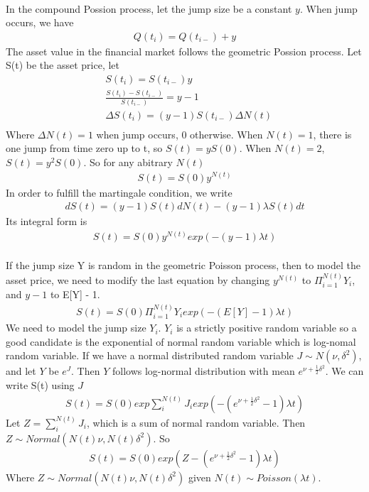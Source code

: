\documentclass[a4paper]{article}
\begin{document}
\\
In the compound Possion process, let the jump size be a constant $y$. When jump occurs, we have 
\begin{align*}
	Q(t_i) = Q(t_{i-}) + y 
\end{align*}
The asset value in the financial market follows the geometric Possion process. Let S(t) be the asset price, let
\begin{align*}
	& S(t_i) = S(t_{i-}) y \\
	& \frac{S(t_i) - S(t_{i-})}{S(t_{i-})} =  y - 1 \\
	&  \Delta S(t_i) =  (y - 1) S(t_{i-}) \Delta N(t)  \\
\end{align*}
Where $\Delta N(t) = 1$ when jump occurs, $0$ otherwise. When $N(t) = 1$, there is one jump from time zero up to t, so $S(t) = yS(0)$. When $N(t) = 2$, $S(t) = y^2 S(0)$. So for any abitrary $N(t)$
\begin{align*}
	S(t) = S(0)y^{N(t)} 
\end{align*}
In order to fulfill the martingale condition, we write
\begin{align*}
	dS(t) = (y - 1)S(t) dN(t) - (y - 1) \lambda S(t) dt
\end{align*}
Its integral form is
\begin{align*}
	S(t) = S(0)y^{N(t)} exp(- (y - 1) \lambda t) 
\end{align*}
\\
If the jump size Y is random in the geometric Poisson process, then to model the asset price, we need to modify
the last equation by changing $y^{N(t)}$ to $\Pi_{i=1}^{N(t)} Y_i$, and $y - 1$ to E[Y] - 1. 
\begin{align*}
	S(t) = S(0)\Pi_{i=1}^{N(t)} Y_i exp(- (E[Y] - 1) \lambda t) 
\end{align*}
We need to model the jump size $Y_i$. $Y_i$ is a strictly positive random variable so a good candidate is the exponential of normal random variable which is log-nomal random variable. If we have a normal distributed random variable $J \sim N(\nu, \delta^2)$, and let $Y$ be $e^{J}$. Then $Y$ follows log-normal distribution with mean $e^{\nu + \frac{1}{2}\delta^2}$. We can write S(t) using $J$
\begin{align*}
	S(t) = S(0) exp{\sum_i^{N(t)} J_i} exp(-(e^{\nu + \frac{1}{2}\delta^2}-1) \lambda t) 
\end{align*}
Let $Z = \sum_i^{N(t)} J_i$, which is a sum of normal random variable. Then $Z \sim Normal(N(t)\nu, N(t)\delta^2)$. So
\begin{align*}
	S(t) = S(0) exp{(Z -(e^{\nu + \frac{1}{2}\delta^2}-1) \lambda t)} 
\end{align*}
Where $ Z \sim Normal(N(t)\nu, N(t)\delta^2)$ given $N(t) \sim Poisson(\lambda t)$.\\
\fi
\end{document}
